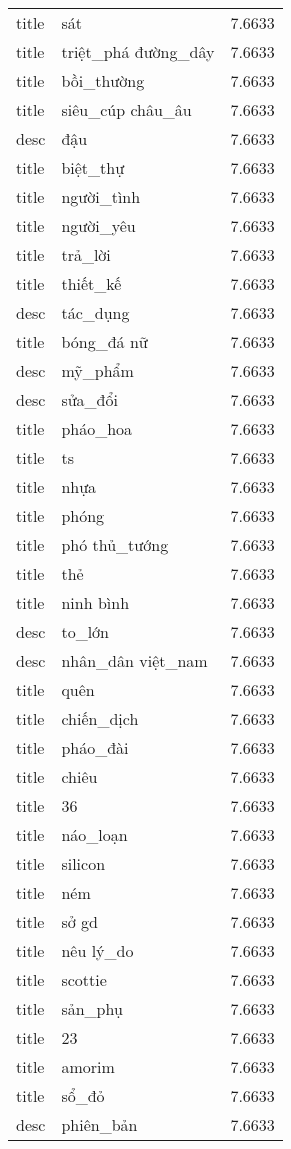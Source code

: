 \documentclass{article}
\begin{document}
\begin{tabular}{lll}
title & sát & 7.6633\\
title & triệt\_phá đường\_dây & 7.6633\\
title & bồi\_thường & 7.6633\\
title & siêu\_cúp châu\_âu & 7.6633\\
desc & đậu & 7.6633\\
title & biệt\_thự & 7.6633\\
title & người\_tình & 7.6633\\
title & người\_yêu & 7.6633\\
title & trả\_lời & 7.6633\\
title & thiết\_kế & 7.6633\\
desc & tác\_dụng & 7.6633\\
title & bóng\_đá nữ & 7.6633\\
desc & mỹ\_phẩm & 7.6633\\
desc & sửa\_đổi & 7.6633\\
title & pháo\_hoa & 7.6633\\
title & ts & 7.6633\\
title & nhựa & 7.6633\\
title & phóng & 7.6633\\
title & phó thủ\_tướng & 7.6633\\
title & thẻ & 7.6633\\
title & ninh bình & 7.6633\\
desc & to\_lớn & 7.6633\\
desc & nhân\_dân việt\_nam & 7.6633\\
title & quên & 7.6633\\
title & chiến\_dịch & 7.6633\\
title & pháo\_đài & 7.6633\\
title & chiêu & 7.6633\\
title & 36 & 7.6633\\
title & náo\_loạn & 7.6633\\
title & silicon & 7.6633\\
title & ném & 7.6633\\
title & sở gd & 7.6633\\
title & nêu lý\_do & 7.6633\\
title & scottie & 7.6633\\
title & sản\_phụ & 7.6633\\
title & 23 & 7.6633\\
title & amorim & 7.6633\\
title & sổ\_đỏ & 7.6633\\
desc & phiên\_bản & 7.6633\\

\end{tabular}
\end{document}
